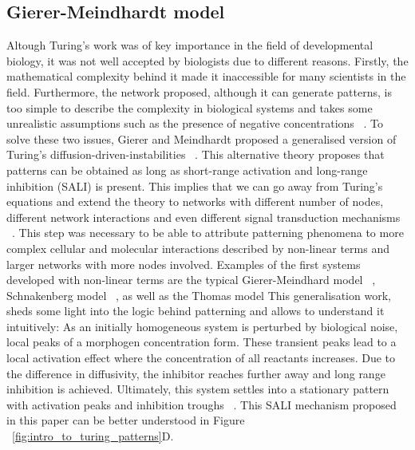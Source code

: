 \subsection{Gierer-Meindhardt model}
Altough Turing’s work was of key importance in the field of developmental biology, it was not well accepted by biologists due to different reasons.
Firstly, the mathematical complexity behind it made it inaccessible for many scientists in the field.
Furthermore, the network proposed, although it can generate patterns, is too simple to describe the complexity in biological systems and takes some unrealistic assumptions such as the presence of negative concentrations ~\parencite{Kondo2010a}.
To solve these two issues, Gierer and Meindhardt proposed a generalised version of Turing’s diffusion-driven-instabilities ~\parencite{Gierer1972}.
This alternative theory proposes that patterns can be obtained as long as short-range activation and long-range inhibition (SALI) is present.
This implies that we can go away from Turing’s equations and extend the theory to networks with different number of nodes, different network interactions and even different signal transduction mechanisms ~\parencite{Murray1983, Rauch2004, Swindale1980}.
This step was necessary to be able to attribute patterning phenomena to more complex cellular and molecular interactions described by non-linear terms and larger networks with more nodes involved.
Examples of the first systems developed with non-linear terms are the typical Gierer-Meindhard model ~\parencite{Gierer1972}, Schnakenberg model ~\parencite{Schnakenberg1979}, as well as the Thomas model %
This generalisation work, sheds some light into the logic behind patterning and allows to understand it intuitively:
As an initially homogeneous system is perturbed by biological noise, local peaks of a morphogen concentration form.
These transient peaks lead to a local activation effect where the concentration of all reactants increases.
Due to the difference in diffusivity, the inhibitor reaches further away and long range inhibition is achieved.
Ultimately, this system settles into a stationary pattern with activation peaks and inhibition troughs ~\parencite{Gierer1972}.
This SALI mechanism proposed in this paper can be better understood in Figure ~\ref{fig:intro_to_turing_patterns}D.
